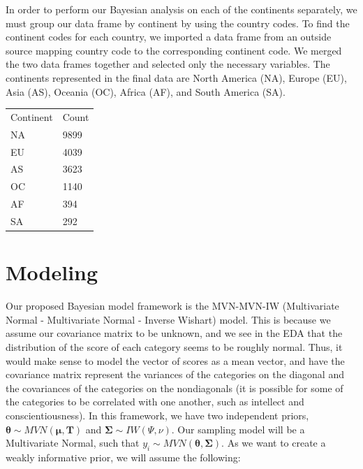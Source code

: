 \documentclass[
]{article}
\begin{document}
In order to perform our Bayesian analysis on each of the continents
separately, we must group our data frame by continent by using the
country codes. To find the continent codes for each country, we imported
a data frame from an outside source mapping country code to the
corresponding continent code. We merged the two data frames together and
selected only the necessary variables. The continents represented in the
final data are North America (NA), Europe (EU), Asia (AS), Oceania (OC),
Africa (AF), and South America (SA).

\setlength{\tabcolsep}{6pt}
 \begin{table}
\centering

\label{tab:unnamed-chunk-7}\begin{tabular}{ll}
  \multicolumn{1}{l}{Continent} & \multicolumn{1}{l}{Count}   \\ 
 \multicolumn{1}{l}{NA} & \multicolumn{1}{l}{9899}   \\ 
 \multicolumn{1}{l}{EU} & \multicolumn{1}{l}{4039}   \\ 
 \multicolumn{1}{l}{AS} & \multicolumn{1}{l}{3623}   \\ 
 \multicolumn{1}{l}{OC} & \multicolumn{1}{l}{1140}   \\ 
 \multicolumn{1}{l}{AF} & \multicolumn{1}{l}{394}   \\ 
 \multicolumn{1}{l}{SA} & \multicolumn{1}{l}{292}   \\ 

 \end{tabular}
\end{table}

\hypertarget{modeling}{%
\section{Modeling}\label{modeling}}

Our proposed Bayesian model framework is the MVN-MVN-IW (Multivariate
Normal - Multivariate Normal - Inverse Wishart) model. This is because
we assume our covariance matrix to be unknown, and we see in the EDA
that the distribution of the score of each category seems to be roughly
normal. Thus, it would make sense to model the vector of scores as a
mean vector, and have the covariance matrix represent the variances of
the categories on the diagonal and the covariances of the categories on
the nondiagonals (it is possible for some of the categories to be
correlated with one another, such as intellect and conscientiousness).
In this framework, we have two independent priors,
\(\boldsymbol \theta \sim MVN(\boldsymbol \mu, \boldsymbol T)\) and
\(\mathbf\Sigma \sim IW(\Psi, \nu)\). Our sampling model will be a
Multivariate Normal, such that
\(y_i \sim MVN(\boldsymbol \theta, \mathbf\Sigma)\). As we want to
create a weakly informative prior, we will assume the following:
\end{document}
